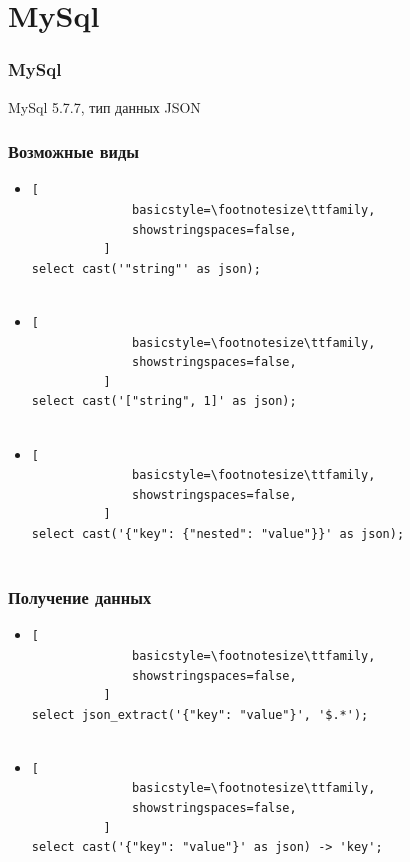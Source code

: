 \documentclass[14pt, compress, aspectratio=169]{beamer}
\begin{document}
\section{MySql}

\begin{frame}[fragile]
    \frametitle{MySql}

    MySql 5.7.7, тип данных JSON
\end{frame}
    
\begin{frame}[fragile]
    \frametitle{Возможные виды}

  \begin{itemize}
      \item<+->
          \begin{lstlisting}[
              basicstyle=\footnotesize\ttfamily,
              showstringspaces=false,
          ]
select cast('"string"' as json);
         
          \end{lstlisting}

      \item<+->
          \begin{lstlisting}[
              basicstyle=\footnotesize\ttfamily,
              showstringspaces=false,
          ]
select cast('["string", 1]' as json);
         
          \end{lstlisting}

      \item<+->
          \begin{lstlisting}[
              basicstyle=\footnotesize\ttfamily,
              showstringspaces=false,
          ]
select cast('{"key": {"nested": "value"}}' as json);
         
          \end{lstlisting}

  \end{itemize}

\end{frame}

\begin{frame}[fragile]
  \frametitle{Получение данных}

  \begin{itemize}
      \item
          \begin{lstlisting}[
              basicstyle=\footnotesize\ttfamily,
              showstringspaces=false,
          ]
select json_extract('{"key": "value"}', '$.*');
         
          \end{lstlisting}

      \item
          \begin{lstlisting}[
              basicstyle=\footnotesize\ttfamily,
              showstringspaces=false,
          ]
select cast('{"key": "value"}' as json) -> 'key';
         
          \end{lstlisting}

  \end{itemize}

\end{frame}
\end{document}
